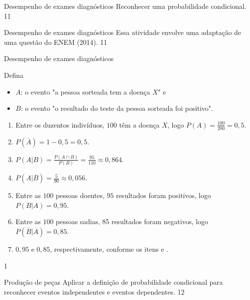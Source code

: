 \clearpage
\def\currentcolor{session2}
\begin{objectives}{Desempenho de exames diagnósticos}
{
Reconhecer uma probabilidade condicional.
}{1}{1}
\end{objectives}
\begin{sugestions}{Desempenho de exames diagnósticos}
{
Essa atividade envolve uma adaptação de uma questão do ENEM (2014).
}{1}{1}
\end{sugestions}
\clearmargin
\begin{answer}{Desempenho de exames diagnósticos}
{
Defina 
\begin{itemize}
\item $A$: o evento "a pessoa sorteada tem a doença $X$"{} e 
\item $B$: o evento "o resultado do teste da pessoa sorteada foi positivo".
\end{itemize}

\begin{enumerate}
\item Entre os duzentos indivíduos, $100$ têm a doença $X$, logo $P(A)=\frac{100}{200}=0{,}5$.
\item $P(\overline{A})=1-0,5=0,5$.
\item $P(A|B)=\frac{P(A\cap B)}{P(B)}=\frac{95}{110}\approx0{,}864$.
\item $P(A|\overline{B})=\frac{5}{90}\approx0,056$.
\item Entre as $100$ pessoas doentes, $95$ resultados foram positivos, logo $P(B|A)=0{,}95$.
\item Entre as $100$ pessoas sadias, 85 resultados foram negativos, logo $P(\overline{B}|\overline{A})=0,85$.
\item $0{,}95$ e $0{,}85$, respectivamente, conforme os itens  e .
\end{enumerate}
}{1}
\end{answer}
\begin{objectives}{Produção de peças}
{
Aplicar a definição de probabilidade condicional para reconhecer eventos independentes e eventos dependentes.
}{1}{2}
\end{objectives}
